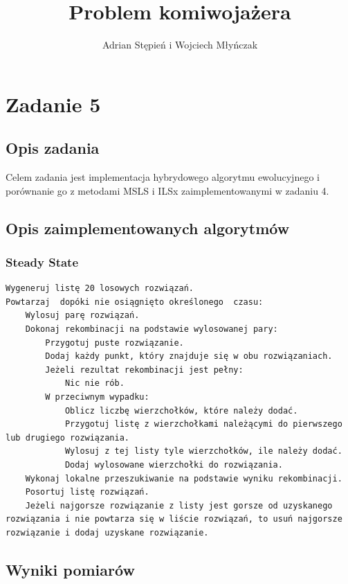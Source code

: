 \documentclass[a4paper]{article}
\title{Problem komiwojażera}
\author{Adrian Stępień i Wojciech Młyńczak}
\begin{document}
\maketitle

\section{Zadanie 5}

\subsection{Opis zadania}

Celem zadania jest implementacja hybrydowego algorytmu ewolucyjnego i porównanie go z metodami MSLS i ILSx zaimplementowanymi w zadaniu 4.

\subsection{Opis zaimplementowanych algorytmów}

\subsubsection{Steady State}

\begin{lstlisting}
Wygeneruj listę 20 losowych rozwiązań.
Powtarzaj  dopóki nie osiągnięto określonego  czasu:
    Wylosuj parę rozwiązań.
    Dokonaj rekombinacji na podstawie wylosowanej pary:
        Przygotuj puste rozwiązanie.
        Dodaj każdy punkt, który znajduje się w obu rozwiązaniach.
        Jeżeli rezultat rekombinacji jest pełny:
            Nic nie rób.
        W przeciwnym wypadku:
            Oblicz liczbę wierzchołków, które należy dodać.
            Przygotuj listę z wierzchołkami należącymi do pierwszego lub drugiego rozwiązania.
            Wylosuj z tej listy tyle wierzchołków, ile należy dodać.
            Dodaj wylosowane wierzchołki do rozwiązania.
    Wykonaj lokalne przeszukiwanie na podstawie wyniku rekombinacji.
    Posortuj listę rozwiązań.
    Jeżeli najgorsze rozwiązanie z listy jest gorsze od uzyskanego rozwiązania i nie powtarza się w liście rozwiązań, to usuń najgorsze rozwiązanie i dodaj uzyskane rozwiązanie.
\end{lstlisting}

\subsection{Wyniki pomiarów}
\end{document}
